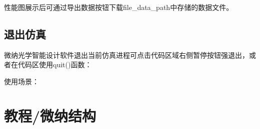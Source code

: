 \documentclass[a4paper,10pt,english]{sphinxmanual}
\begin{document}
{{{{{{\begin{sphinxVerbatim}[commandchars=\\\{\}]
  
   
   
\end{sphinxVerbatim}

\sphinxAtStartPar
性能图展示后可通过导出数据按钮下载file\_data\_path中存储的数据文件。


\subsection{退出仿真}
\label{\detokenize{_u8f6f_u4ef6API_u63a5_u53e3/_u4eff_u771f/_u4eff_u771f:id11}}
\sphinxAtStartPar
微纳光学智能设计软件退出当前仿真进程可点击代码区域右侧暂停按钮强退出，或者在代码区使用quit()函数：

\begin{sphinxVerbatim}[commandchars=\\\{\}]
 
\end{sphinxVerbatim}

\sphinxAtStartPar
使用场景：

\begin{sphinxVerbatim}[commandchars=\\\{\}]
\end{sphinxVerbatim}

\sphinxstepscope


\section{教程/微纳结构}
\label{\detokenize{_u8f6f_u4ef6API_u63a5_u53e3/_u5fae_u7eb3_u7ed3_u6784/_u5fae_u7eb3_u7ed3_u6784:id1}}\label{\detokenize{_u8f6f_u4ef6API_u63a5_u53e3/_u5fae_u7eb3_u7ed3_u6784/_u5fae_u7eb3_u7ed3_u6784::doc}}

}}}}}}
\end{document}
